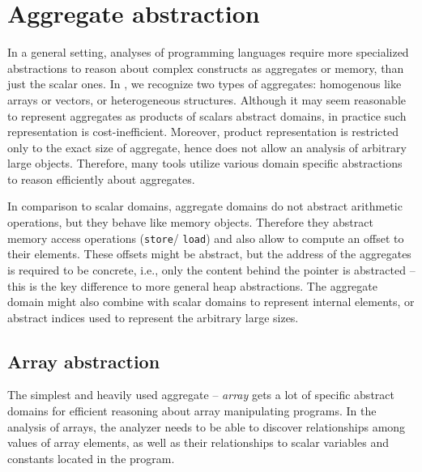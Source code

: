 

\section{Aggregate abstraction}

In a general setting, analyses of programming languages require more
specialized abstractions to reason about complex constructs as aggregates or
memory, than just the scalar ones. In \llvm, we recognize two types of
aggregates: homogenous like arrays or vectors, or heterogeneous structures.
Although it may seem reasonable to represent aggregates as products of scalars
abstract domains, in practice such representation is cost-inefficient.
Moreover, product representation is restricted only to the exact size of
aggregate, hence does not allow an analysis of arbitrary large objects.
Therefore, many tools utilize various domain specific abstractions to reason
efficiently about aggregates.

In comparison to scalar domains, aggregate domains do not abstract arithmetic
operations, but they behave like memory objects. Therefore they abstract memory
access operations (\texttt{store}/ \texttt{load}) and also allow to compute an
offset to their elements. These offsets might be abstract, but the address of
the aggregates is required to be concrete, i.e., only the content behind the
pointer is abstracted -- this is the key difference to more general heap
abstractions. The aggregate domain might also combine with scalar domains to
represent internal elements, or abstract indices used to represent the
arbitrary large sizes.

\subsection{Array abstraction}

The simplest and heavily used aggregate -- \emph{array} gets a lot of specific
abstract domains for efficient reasoning about array manipulating programs. In
the analysis of arrays, the analyzer needs to be able to discover relationships
among values of array elements, as well as their relationships to scalar
variables and constants located in the program.

